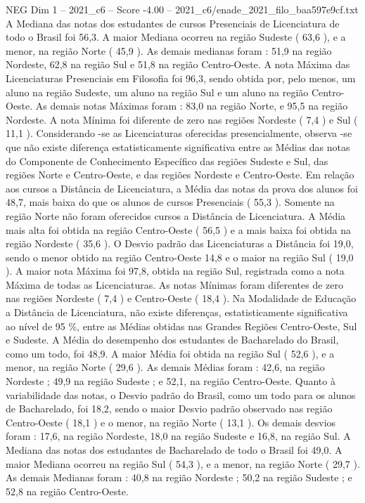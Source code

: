 \begin{textsample}{NEG Dim 1 – 2021\_c6 – Score -4.00 – 2021\_c6/enade\_2021\_filo\_baa597e9cf.txt}
A Mediana das notas dos estudantes de cursos Presenciais de Licenciatura de todo o Brasil foi 56,3.
A maior Mediana ocorreu na região Sudeste ( 63,6 ), e a menor, na região Norte ( 45,9 ).
As demais medianas foram : 51,9 na região Nordeste, 62,8 na região Sul e 51,8 na região Centro-Oeste.
A nota Máxima das Licenciaturas Presenciais em Filosofia foi 96,3, sendo obtida por, pelo menos, um aluno na região Sudeste, um aluno na região Sul e um aluno na região Centro-Oeste.
As demais notas Máximas foram : 83,0 na região Norte, e 95,5 na região Nordeste.
A nota Mínima foi diferente de zero nas regiões Nordeste ( 7,4 ) e Sul ( 11,1 ).
Considerando -se as Licenciaturas oferecidas presencialmente, observa -se que não existe diferença estatisticamente significativa entre as Médias das notas do Componente de Conhecimento Específico das regiões Sudeste e Sul, das regiões Norte e Centro-Oeste, e das regiões Nordeste e Centro-Oeste.
Em relação aos cursos a Distância de Licenciatura, a Média das notas da prova dos alunos foi 48,7, mais baixa do que os alunos de cursos Presenciais ( 55,3 ).
Somente na região Norte não foram oferecidos cursos a Distância de Licenciatura.
A Média mais alta foi obtida na região Centro-Oeste ( 56,5 ) e a mais baixa foi obtida na região Nordeste ( 35,6 ).
O Desvio padrão das Licenciaturas a Distância foi 19,0, sendo o menor obtido na região Centro-Oeste 14,8 e o maior na região Sul ( 19,0 ).
A maior nota Máxima foi 97,8, obtida na região Sul, registrada como a nota Máxima de todas as Licenciaturas.
As notas Mínimas foram diferentes de zero nas regiões Nordeste ( 7,4 ) e Centro-Oeste ( 18,4 ).
Na Modalidade de Educação a Distância de Licenciatura, não existe diferenças, estatisticamente significativa ao nível de 95 \%, entre as Médias obtidas nas Grandes Regiões Centro-Oeste, Sul e Sudeste.
A Média do desempenho dos estudantes de Bacharelado do Brasil, como um todo, foi 48,9.
A maior Média foi obtida na região Sul ( 52,6 ), e a menor, na região Norte ( 29,6 ).
As demais Médias foram : 42,6, na região Nordeste ; 49,9 na região Sudeste ; e 52,1, na região Centro-Oeste.
Quanto à variabilidade das notas, o Desvio padrão do Brasil, como um todo para os alunos de Bacharelado, foi 18,2, sendo o maior Desvio padrão observado nas região Centro-Oeste ( 18,1 ) e o menor, na região Norte ( 13,1 ).
Os demais desvios foram : 17,6, na região Nordeste, 18,0 na região Sudeste e 16,8, na região Sul.
A Mediana das notas dos estudantes de Bacharelado de todo o Brasil foi 49,0.
A maior Mediana ocorreu na região Sul ( 54,3 ), e a menor, na região Norte ( 29,7 ).
As demais Medianas foram : 40,8 na região Nordeste ; 50,2 na região Sudeste ; e 52,8 na região Centro-Oeste.

\end{textsample}

